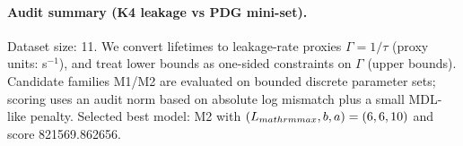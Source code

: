 \paragraph{Audit summary (K4 leakage vs PDG mini-set).} \AuditTag Dataset size: 11. We convert lifetimes to leakage-rate proxies $\Gamma=1/\tau$ (proxy units: s$^{-1}$), and treat lower bounds as one-sided constraints on $\Gamma$ (upper bounds). Candidate families M1/M2 are evaluated on bounded discrete parameter sets; scoring uses an audit norm based on absolute log mismatch plus a small MDL-like penalty.
\noindent\AuditTag Selected best model: M2 with $(L_{\\mathrm{max}},b,a)=(6,6,10)$ and score 821569.862656.